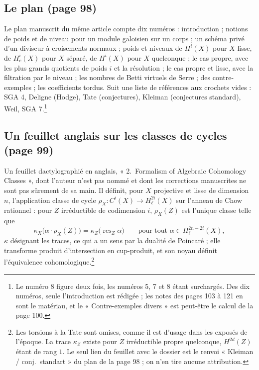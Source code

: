 \documentclass[11pt,a4paper]{article}
\begin{document}
\subsection*{Le plan (page 98)}

Le plan manuscrit du même article compte dix numéros : introduction ; notions de
poids et de niveau pour un module galoisien sur un corps ; un schéma privé d'un
diviseur à croisements normaux ; poids et niveaux de $H^{i}(X)$ pour $X$ lisse, de
$H^{i}_{c}(X)$ pour $X$ séparé, de $H^{i}(X)$ pour $X$ quelconque ; le cas propre,
avec les plus grands quotients de poids $i$ et la résolution ; le cas propre et
lisse, avec la filtration par le niveau ; les nombres de Betti virtuels de Serre ;
des contre-exemples ; les coefficients tordus. Suit une liste de références aux
crochets vides : SGA 4, Deligne (Hodge), Tate (conjectures), Kleiman (conjectures
standard), Weil, SGA 7.\footnote{Le numéro 8 figure deux fois, les numéros 5, 7
et 8 étant surchargés. Des dix numéros, seule l'introduction est rédigée ; les
notes des pages 103 à 121 en sont le matériau, et le « Contre-exemples divers »
est peut-être le calcul de la page 100.}

\subsection*{Un feuillet anglais sur les classes de cycles (page 99)}

Un feuillet dactylographié en anglais, « 2.\ Formalism of Algebraic Cohomology
Classes », dont l'auteur n'est pas nommé et dont les corrections manuscrites ne
sont pas sûrement de sa main. Il définit, pour $X$ projective et lisse de
dimension $n$, l'application classe de cycle $\rho_{X} \colon C^{i}(X) \to
H^{2i}_{\ell}(X)$ sur l'anneau de Chow rationnel : pour $Z$ irréductible de
codimension $i$, $\rho_{X}(Z)$ est l'unique classe telle que
\[
\kappa_{X}\bigl(\alpha \cdot \rho_{X}(Z)\bigr) = \kappa_{Z}\bigl(\operatorname{res}_{Z}\alpha\bigr)
\qquad \text{pour tout } \alpha \in H^{2n-2i}_{\ell}(X) ,
\]
$\kappa$ désignant les traces, ce qui a un sens par la dualité de Poincaré ; elle
transforme produit d'intersection en cup-produit, et son noyau définit
l'équivalence cohomologique.\footnote{Les torsions à la Tate sont omises, comme il
est d'usage dans les exposés de l'époque. La trace $\kappa_{Z}$ existe pour $Z$
irréductible propre quelconque, $H^{2d}(Z)$ étant de rang $1$. Le seul lien du
feuillet avec le dossier est le renvoi « Kleiman / conj.\ standart » du plan de la
page 98 ; on n'en tire aucune attribution.}
\end{document}
